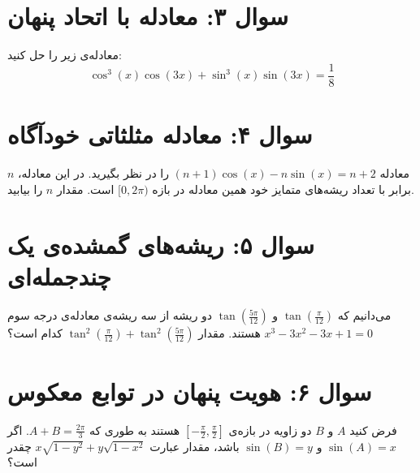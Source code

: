 \documentclass[12pt]{article}
\begin{document}
	\section*{سوال ۳: معادله با اتحاد پنهان}
	معادله‌ی زیر را حل کنید:
	\begin{displaymath}
		\cos^3(x)\cos(3x) + \sin^3(x)\sin(3x) = \frac{1}{8}
	\end{displaymath}
	
	
	\vspace{1cm}
	\hrulefill
	\vspace{1cm}
	\section*{سوال ۴: معادله مثلثاتی خودآگاه}
	معادله \((n + 1)\cos(x) - n \sin(x) = n + 2\) را در نظر بگیرید. در این معادله، \(n\) برابر با تعداد ریشه‌های متمایز خود همین معادله در بازه \([0, 2\pi)\) است. مقدار \(n\) را بیابید.
	
	
	\vspace{1cm}
	\hrulefill
	\vspace{1cm}
	\section*{سوال ۵: ریشه‌های گمشده‌ی یک چندجمله‌ای}
	می‌دانیم که \( \tan(\frac{\pi}{12}) \) و \( \tan(\frac{5\pi}{12}) \) دو ریشه از سه ریشه‌ی معادله‌ی درجه سوم \( x^3 - 3x^2 - 3x + 1 = 0 \) هستند. مقدار \( \tan^2(\frac{\pi}{12}) + \tan^2(\frac{5\pi}{12}) \) کدام است؟
	
	
	\vspace{1cm}
	\hrulefill
	\vspace{1cm}
	\section*{سوال ۶: هویت پنهان در توابع معکوس}
	فرض کنید \(A\) و \(B\) دو زاویه در بازه‌ی \( [-\frac{\pi}{2}, \frac{\pi}{2}] \) هستند به طوری که \(A+B = \frac{2\pi}{3}\). اگر \( \sin(A) = x \) و \( \sin(B) = y \) باشد، مقدار عبارت \( x\sqrt{1-y^2} + y\sqrt{1-x^2} \) چقدر است؟
	
\end{document}
